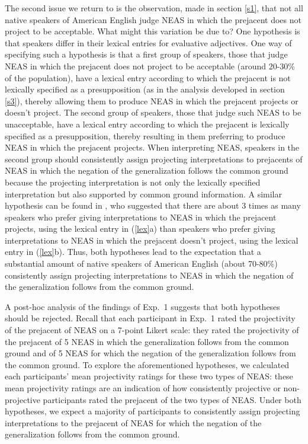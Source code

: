 \documentclass[11pt,fleqn]{article}
\newcommand{\6}{\mbox{$[\hspace*{-.6mm}[$}}
\newcommand{\9}{\mbox{$]\hspace*{-.6mm}]$}}
\begin{document}
The second issue we return to is the observation, made in section \ref{s1}, that not all native speakers of American English judge NEAS in which the prejacent does not project to be acceptable. What might this variation be due to? One hypothesis is that speakers differ in their lexical entries for evaluative adjectives. One way of specifying such a hypothesis is that a first group of speakers, those that judge NEAS in which the prejacent does not project to be acceptable (around 20-30\% of the population), have a lexical entry according to which the prejacent is not lexically specified as a presupposition (as in the analysis developed in section \ref{s3}), thereby allowing them to produce NEAS in which the prejacent projects or doesn't project. The second group of speakers, those that judge such NEAS to be unacceptable, have a lexical entry according to which the prejacent is lexically specified as a presupposition, thereby resulting in them preferring to produce NEAS in which the prejacent projects. When interpreting NEAS, speakers in the second group should consistently assign projecting interpretations to prejacents of NEAS in which the negation of the generalization follows the common ground because the projecting interpretation is not only the lexically specified interpretation but also supported by  common ground information. A similar hypothesis can be found in \citet[243]{karttunen-etal2014}, who suggested that there are about 3 times as many speakers who prefer giving interpretations to NEAS in which the prejacent projects, using the lexical entry in (\ref{lex}a) than speakers who prefer giving interpretations to NEAS in which the prejacent doesn't project, using the lexical entry in (\ref{lex}b). Thus, both hypotheses lead to the expectation that a substantial amount of native speakers of American English (about 70-80\%) consistently assign projecting interpretations to NEAS in which the negation of the generalization follows from the common ground.

A post-hoc analysis of the findings of Exp.~1 suggests that both hypotheses should be rejected. Recall that each participant in Exp.~1 rated the projectivity of the prejacent of NEAS on a 7-point Likert scale: they rated the projectivity of the prejacent of 5 NEAS in which the generalization follows from the common ground and of 5 NEAS for which the negation of the generalization follows from the common ground. To explore the aforementioned hypotheses, we calculated each participants' mean projectivity ratings for these two types of NEAS: these mean projectivity ratings are an indication of how consistently projective or non-projective participants rated the prejacent of the two types of NEAS. Under both hypotheses, we expect a majority of participants to consistently assign projecting interpretations to the prejacent of NEAS for which the negation of the generalization follows from the common ground. 
\end{document}
